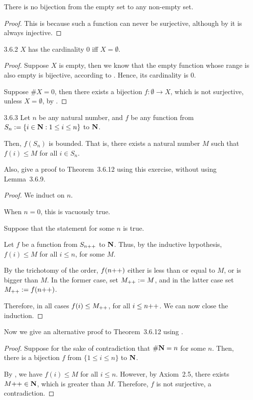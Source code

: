 \begin{why}{59}
	There is no bijection from the empty set to any non-empty set.
\end{why}
\begin{proof}
	This is because such a function can never be surjective, although by  it is always injective.
\end{proof}

\begin{exercise}{3.6.2}
	$X$ has the cardinality 0 iff $X = \emptyset$.
\end{exercise}
\begin{proof}
\myifbox Suppose $X$ is empty, then we know that the empty function whose range is also empty is bijective, according to . Hence, its cardinality is $0$. 

\myoifbox Suppose $\# X = 0$, then there exists a bijection 
$f: \emptyset \to X$, which is not surjective, unless $X = \emptyset$, by .
\end{proof}

\begin{exercise}{3.6.3}
	Let $n$ be any natural number, and $f$ be any function from $S_n := \{i \in \mathbf{N}: 1 \le i \le n\}$ to $\mathbf{N}$.
	
	Then, $f(S_n)$ is bounded. That is, there exists a natural number $M$ such that $f(i) \le M$ for all $i \in S_n$.
	
	Also, give a proof to Theorem~3.6.12 using this exercise, without using Lemma~3.6.9.
\end{exercise}
\begin{proof}
We induct on $n$.
	
\mybcbox When $n = 0$, this is vacuously true.

\myisbox Suppose that the statement for some $n$ is true. 

Let $f$ be a function from $S_{n{+}{+}}$ to $\mathbf{N}$. Thus, by the inductive hypothesis, $f(i) \le M$ for all $i \le n$, for some $M$.

By the trichotomy of the order, $f(n{+}{+})$ either is less than or equal to $M$, or is bigger than $M$. In the former case, set $M_{{+}{+}} := M$, and in the latter case set $M_{{+}{+}} := f(n{+}{+})$. 

Therefore, in all cases $f(i) \le M_{{+}{+}}$, for all $i \le n{+}{+}$. We can now close the induction.
\end{proof}

Now we give an alternative proof to Theorem~3.6.12 using .
\begin{proof}
	Suppose for the sake of contradiction that $\#\mathbf{N} = n$ for some $n$. Then, there is a bijection $f$ from $\{1 \le i \le n\}$ to $\mathbf{N}$.
	
	By , we have $f(i) \le M$ for all $i \le n$. However, by Axiom~2.5, there exists $M{+}{+} \in \mathbf{N}$, which is greater than $M$. Therefore, $f$ is not surjective, a contradiction.
\end{proof}

